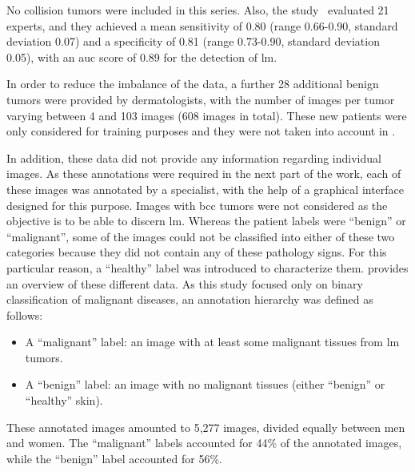 \documentclass[journal,article,accept,moreauthors,pdftex, applsci]{Definitions/mdpi}
\begin{document}
No collision tumors were included in this series. Also, the study~\cite{Cinotti2018} evaluated 21 experts, and they achieved a mean sensitivity of 0.80 (range 0.66-0.90, standard deviation 0.07) and a specificity of 0.81 (range 0.73-0.90, standard deviation 0.05), with an \ac{auc} score of 0.89 for the detection of \ac{lm}.\par
In order to reduce the imbalance of the data, a further 28 additional benign tumors were provided by dermatologists, with the number of images per tumor varying between 4 and 103 images (608 images in total). These new patients were only considered for training purposes and they were not taken into account in .\par
In addition, these data did not provide any information regarding individual images. As these annotations were required in the next part of the work, each of these images was annotated by a specialist, with the help of a graphical interface designed for this purpose. Images with \ac{bcc} tumors were not considered as the objective is to be able to discern \ac{lm}. Whereas the patient labels were “benign” or “malignant”, some of the images could not be classified into either of these two categories because they did not contain any of these pathology signs. For this particular reason, a “healthy” label was introduced to characterize them.  provides an overview of these different data. As this study focused only on binary classification of malignant diseases, an annotation hierarchy was defined as follows:
\begin{itemize}
\item A “malignant” label: an image with at least some malignant tissues from \ac{lm} tumors.
\item A “benign” label: an image with no malignant tissues (either “benign” or “healthy” skin).
\end{itemize}
These annotated images amounted to 5,277 images, divided equally between men and women. The “malignant” labels accounted for 44\% of the annotated images, while the “benign” label accounted for 56\%.\par
\end{document}
